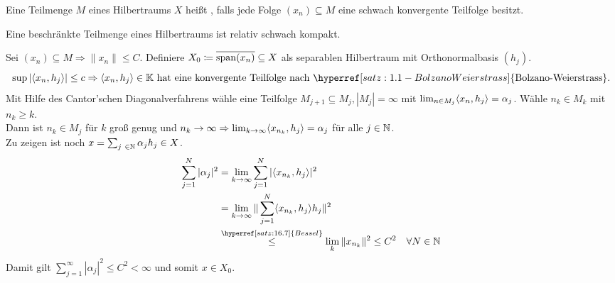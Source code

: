 \begin{definition}
	Eine Teilmenge $M$ eines Hilbertraums $X$ hei{\ss}t , falls jede Folge $(x_{n}) \subseteq M$ eine schwach konvergente Teilfolge besitzt.
\end{definition}


\begin{satz}
	Eine beschränkte Teilmenge eines Hilbertraums ist relativ schwach kompakt.	
\end{satz}

\begin{beweis}
	Sei $(x_{n}) \subseteq M \Rightarrow \| x_{n} \| \leq C$. Definiere $X_{0} \coloneqq \overline{\operatorname{span}(x_{n})} \subseteq X$ als separablen Hilbertraum mit Orthonormalbasis $(h_{j})$.	
		\[ \sup | \< x_{n} , h_{j} \> | \leq c \Rightarrow \< x_{n} , h_{j} \> \in \MdK \text{ hat eine konvergente Teilfolge nach } \hyperref[satz:1.1-BolzanoWeierstrass]{\text{Bolzano-Weierstrass}}. \]
		Mit Hilfe des Cantor'schen Diagonalverfahrens wähle eine Teilfolge $M_{j+1} \subseteq M_{j}, |M_{j}| = \infty$ mit $\lim_{n \in M_{j}} \langle x_{n} , h_{j} \rangle = \alpha_{j}$. Wähle $n_{k} \in M_{k}$ mit $n_{k} \geq k$. \\
		Dann ist $n_{k} \in M_{j}$ für $k$ gro{\ss} genug und $n_{k} \rightarrow \infty \Rightarrow \lim_{k \rightarrow \infty} \langle x_{n_{k}} , h_{j} \rangle = \alpha_{j}$ für alle $j \in \mathbb{N}$. \\
		Zu zeigen ist noch $x = \sum_{j \in \MdN} \alpha_{j} h_{j} \in X$.
		\begin{align*}
			\sum_{j = 1}^{N} | \alpha_{j} |^{2} & = \lim_{k \rightarrow \infty} \sum_{j = 1}^{N} | \< x_{n_{k}} , h_{j} \> |^{2} \\
				& = \lim_{k \rightarrow \infty} \| \sum_{j = 1}^{N} \< x_{n_{k}} , h_{j} \> h_{j} \|^{2} \\
				& \overset{\hyperref[satz:16.7]{Bessel}}{\leq} \lim_{k} \| x_{n_{k}} \|^{2} \leq C^{2} \quad \forall N \in \MdN
		\end{align*}
		Damit gilt $\sum_{j = 1}^{\infty} | \alpha_{j} |^{2} \leq C^{2} < \infty$ und somit $x \in X_{0}$.
\end{beweis}



\newpage